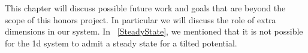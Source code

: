 This chapter will discuss possible future work and goals that are beyond the scope of this honors project. In particular we will discuss the role of extra dimensions in our system. In ~\autoref{SteadyState}, we mentioned that it is not possible for the 1d system to admit a steady state for a tilted potential. 